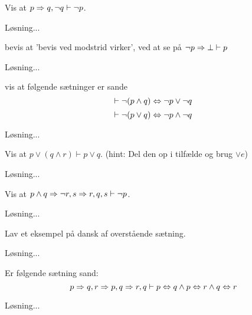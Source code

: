 \begin{opg}
\begin{solution}
    \end{solution}
\end{opg}

\begin{opg}
    Vis at $p \Rightarrow q, \lnot q \vdash \lnot p$.
	\begin{solution}
		Løsning...
	\end{solution}
\end{opg}

\begin{opg}
    bevis at 'bevis ved modstrid virker', ved at se på $\lnot p \Rightarrow \bot \vdash p$
    \begin{solution}
        Løsning...
    \end{solution}
\end{opg}

\begin{opg}
    vis at følgende sætninger er sande
    \[ \vdash \lnot (p \land q) \Leftrightarrow \lnot p \lor \lnot q \]
    \[ \vdash \lnot (p \lor q) \Leftrightarrow \lnot p \land \lnot q \]
	\begin{solution}
		Løsning...
	\end{solution}
\end{opg}

\begin{opg}
    Vis at $p \lor (q \land r) \vdash p \lor q$.
    (hint: Del den op i tilfælde og brug $\lor e$)
	\begin{solution}
		Løsning...
	\end{solution}
\end{opg}

\begin{opg}
    Vis at $p \land q \Rightarrow \lnot r, s \Rightarrow r, q, s \vdash \lnot p$.
	\begin{solution}
		Løsning...
	\end{solution}
\end{opg}

\begin{opg}
    Lav et eksempel på dansk af overstående sætning.
	\begin{solution}
		Løsning...
	\end{solution}
\end{opg}

\begin{opg}
    Er følgende sætning sand:
    \[ p \Rightarrow q, r \Rightarrow p, q \Rightarrow r, q \vdash p \Leftrightarrow q \land p \Leftrightarrow r \land q \Leftrightarrow r \]
	\begin{solution}
		Løsning...
	\end{solution}
\end{opg}

